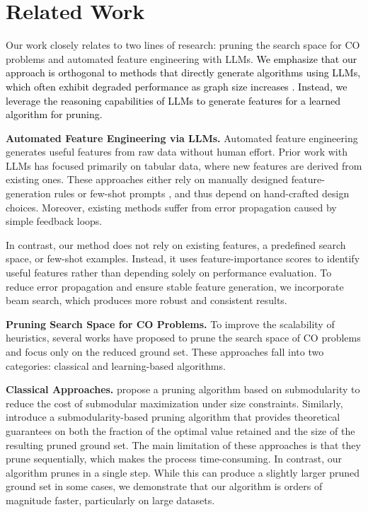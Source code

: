 \section{Related Work} \label{sec:related_work}
Our work closely relates to two lines of research: pruning the search space for CO problems and automated feature engineering with LLMs. \textcolor{black}{We emphasize that our approach is orthogonal to methods that directly generate algorithms using LLMs, which often exhibit degraded performance as graph size increases \citep{yang2023large,liu2024evolution}. Instead, we leverage the reasoning capabilities of LLMs to generate features for a learned algorithm for pruning.}

\textbf{Automated Feature Engineering via LLMs.} Automated feature engineering generates useful features from raw data without human effort. Prior work with LLMs has focused primarily on tabular data, where new features are derived from existing ones. These approaches either rely on manually designed feature-generation rules \citep{zhang2023openfe,zhang2024dynamic} or few-shot prompts \citep{han2024large}, and thus depend on hand-crafted design choices. Moreover, existing methods \citep{nam2024optimized,hollmann2023large} suffer from error propagation caused by simple feedback loops.

In contrast, our method does not rely on existing features, a predefined search space, or few-shot examples. Instead, it uses feature-importance scores to identify useful features rather than depending solely on performance evaluation. To reduce error propagation and ensure stable feature generation, we incorporate beam search, which produces more robust and consistent results.

\textbf{Pruning Search Space for CO Problems.} To improve the scalability of heuristics, several works have proposed to prune the search space of CO problems and focus only on the reduced ground set. These approaches fall into two categories: classical and learning-based algorithms.

\textbf{Classical Approaches.} \citet{zhou2017scaling} propose a pruning algorithm based on submodularity to reduce the cost of submodular maximization under size constraints. Similarly, \citet{pmlr-v258-nath25a} introduce a submodularity-based pruning algorithm that provides theoretical guarantees on both the fraction of the optimal value retained and the size of the resulting pruned ground set. The main limitation of these approaches is that they prune sequentially, which makes the process time-consuming. In contrast, our algorithm prunes in a single step. While this can produce a slightly larger pruned ground set in some cases, we demonstrate that our algorithm is orders of magnitude faster, particularly on large datasets.

